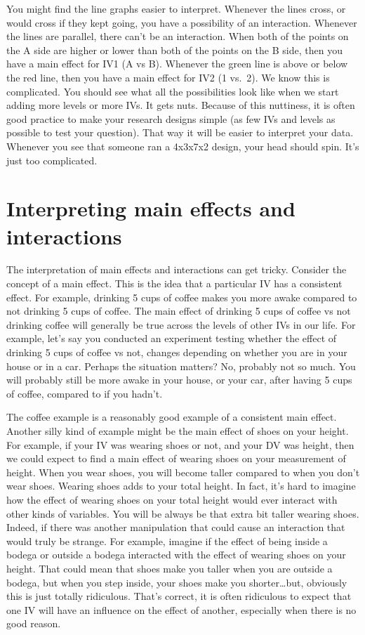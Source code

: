 \documentclass[
]{book}
\begin{document}
You might find the line graphs easier to interpret. Whenever the lines cross, or would cross if they kept going, you have a possibility of an interaction. Whenever the lines are parallel, there can't be an interaction. When both of the points on the A side are higher or lower than both of the points on the B side, then you have a main effect for IV1 (A vs B). Whenever the green line is above or below the red line, then you have a main effect for IV2 (1 vs.~2). We know this is complicated. You should see what all the possibilities look like when we start adding more levels or more IVs. It gets nuts. Because of this nuttiness, it is often good practice to make your research designs simple (as few IVs and levels as possible to test your question). That way it will be easier to interpret your data. Whenever you see that someone ran a 4x3x7x2 design, your head should spin. It's just too complicated.

\section{Interpreting main effects and interactions}\label{interpreting-main-effects-and-interactions}

The interpretation of main effects and interactions can get tricky. Consider the concept of a main effect. This is the idea that a particular IV has a consistent effect. For example, drinking 5 cups of coffee makes you more awake compared to not drinking 5 cups of coffee. The main effect of drinking 5 cups of coffee vs not drinking coffee will generally be true across the levels of other IVs in our life. For example, let's say you conducted an experiment testing whether the effect of drinking 5 cups of coffee vs not, changes depending on whether you are in your house or in a car. Perhaps the situation matters? No, probably not so much. You will probably still be more awake in your house, or your car, after having 5 cups of coffee, compared to if you hadn't.

The coffee example is a reasonably good example of a consistent main effect. Another silly kind of example might be the main effect of shoes on your height. For example, if your IV was wearing shoes or not, and your DV was height, then we could expect to find a main effect of wearing shoes on your measurement of height. When you wear shoes, you will become taller compared to when you don't wear shoes. Wearing shoes adds to your total height. In fact, it's hard to imagine how the effect of wearing shoes on your total height would ever interact with other kinds of variables. You will be always be that extra bit taller wearing shoes. Indeed, if there was another manipulation that could cause an interaction that would truly be strange. For example, imagine if the effect of being inside a bodega or outside a bodega interacted with the effect of wearing shoes on your height. That could mean that shoes make you taller when you are outside a bodega, but when you step inside, your shoes make you shorter\ldots but, obviously this is just totally ridiculous. That's correct, it is often ridiculous to expect that one IV will have an influence on the effect of another, especially when there is no good reason.
\end{document}
